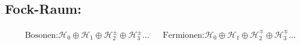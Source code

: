 \documentclass[10pt,a4paper,notitlepage]{scrartcl}
\begin{document}
\subsection*{Fock-Raum:}
\begin{align*}
   &\text{Bosonen:} \mathcal{H}_0 \oplus \mathcal{H}_1 \oplus \mathcal{H}_2^\pm \oplus \mathcal{H}_3^\pm\ldots
   && \text{Fermionen:} \mathcal{H}_0 \oplus \mathcal{H}_1 \oplus \mathcal{H}_2^\mp \oplus \mathcal{H}_3^\mp\ldots\\
\end{align*}
\end{document}
